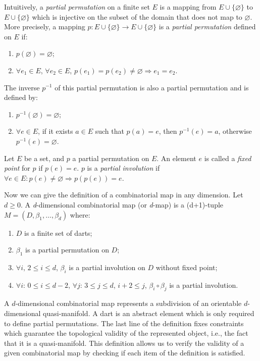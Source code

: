 Intuitively, a \emph{partial permutation} on a finite set $E$ is a
mapping from $E\cup\{\varnothing\}$ to $E\cup\{\varnothing\}$ which is
injective on the subset of the domain that does not map to
$\varnothing$.  More precisely, a mapping $p:E \cup \{\varnothing\}
\rightarrow E \cup \{\varnothing\}$ is a \emph{partial permutation}
defined on $E$ if:
\begin{enumerate}
\item $p(\varnothing)=\varnothing$;
\item $\forall e_1 \in E$, $\forall e_2 \in E$,
  $p(e_1)=p(e_2)\neq \varnothing \Rightarrow e_1=e_2$.
\end{enumerate}

The inverse $p^{-1}$ of this partial permutation is also a partial
permutation and is defined by:
\begin{enumerate}
\item $p^{-1}(\varnothing)=\varnothing$;
\item $\forall e \in E$, if it exists $a\in E$ such that $p(a)=e$,
  then $p^{-1}(e)=a$, otherwise $p^{-1}(e)=\varnothing$.
\end{enumerate}

Let $E$ be a set, and $p$ a partial permutation on $E$.  An element
$e$ is called a \emph{fixed point} for $p$ if $p(e)=e$.  $p$ is a
\emph{partial involution} if $\forall e \in E: p(e)\neq \varnothing
\Rightarrow p(p(e))=e$.

Now we can give the definition of a combinatorial map in any dimension.
Let $d \geq 0$. A \emph{d}-dimensional combinatorial map (or 
\emph{d}-map) is a (d+1)-tuple $M=(D,\beta_1,\ldots,\beta_d)$ 
where:
\begin{enumerate}
\item $D$ is a finite set of darts;
\item $\beta_1$ is a partial permutation on $D$;
\item $\forall i, \, 2 \leq i \leq d$, $\beta_i$ is a
  partial involution on $D$ without fixed point;
\item\label{cond-composition} $\forall i:\, 0 \leq i \leq d-2$,
  $\forall j:\, 3 \leq j \leq d$, $i+2 \leq j$,
  $\beta_{i}\circ\beta_{j}$ is a partial involution.
\end{enumerate}

A $d$-dimensional combinatorial map represents a subdivision of an
orientable $d$-dimensional quasi-manifold. A dart is an abstract element
which is only required to define partial permutations. The last line of
the definition fixes constraints which guarantee the topological
validity of the represented object, i.e., the fact that it is a
quasi-manifold. This definition allows us to verify the validity of a
given combinatorial map by checking if each item of the definition is
satisfied.

